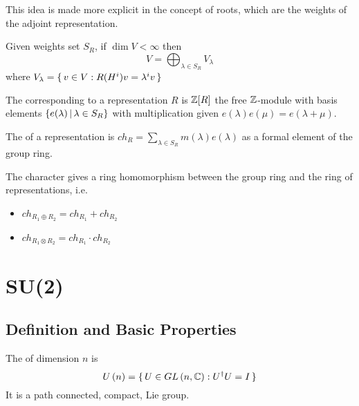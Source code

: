 \documentclass{article}
\begin{document}
\begin{idea}
	This idea is made more explicit in the concept of roots, which are the weights of the adjoint representation. 
\end{idea}

\begin{fact}
	Given weights set $S_R$, if $\dim V < \infty$ then 
	\[
	V=\bigoplus_{\lambda\in S_R} V_\lambda
	\]
	where $V_\lambda=\set{ v\in V : R(H^i)v=\lambda^i v}$
\end{fact}


\begin{definition}
	The  corresponding to a representation $R$ is $\mathbb{Z}[R]$ the free $\mathbb{Z}$-module with basis elements $\left\{ e(\lambda) \, | \, \lambda \in S_R \right\}$ with multiplication given $e(\lambda)e(\mu) = e(\lambda + \mu)$.  
\end{definition}

\begin{definition}
	The  of a representation is $ch_R = \sum_{\lambda \in S_R} m(\lambda) e(\lambda)$ as a formal element of the group ring. 
\end{definition}

\begin{prop}
	The character gives a ring homomorphism between the group ring and the ring of representations, i.e. 
	\begin{itemize}
		\item $ch_{R_1 \oplus R_2} = ch_{R_1} + ch_{R_2}$ 
		\item $ch_{R_1 \otimes R_2} = ch_{R_1} \cdot ch_{R_2}$
	\end{itemize}
\end{prop}

\section{SU(2)}
\subsection{Definition and Basic Properties}

\begin{definition}[U($n$)]
	The  of dimension $n$ is 
	\[
	U\left(n\right)=\set{  U\in GL\left(n,\mathbb{C}\right) : U^\dagger U=I  }
	\]
	It is a path connected, compact, Lie group.
\end{definition}
\end{document}
